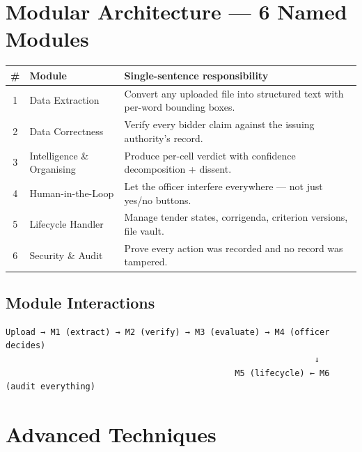 \documentclass[11pt,a4paper]{article}
\begin{document}
\section{Modular Architecture — 6 Named Modules}

\begin{center}
\begin{tabular}{clp{8cm}}
\toprule
\textbf{\#} & \textbf{Module} & \textbf{Single-sentence responsibility} \\
\midrule
1 & Data Extraction & Convert any uploaded file into structured text with per-word bounding boxes. \\
2 & Data Correctness & Verify every bidder claim against the issuing authority's record. \\
3 & Intelligence \& Organising & Produce per-cell verdict with confidence decomposition + dissent. \\
4 & Human-in-the-Loop & Let the officer interfere everywhere — not just yes/no buttons. \\
5 & Lifecycle Handler & Manage tender states, corrigenda, criterion versions, file vault. \\
6 & Security \& Audit & Prove every action was recorded and no record was tampered. \\
\bottomrule
\end{tabular}
\end{center}

\subsection{Module Interactions}

\begin{verbatim}
Upload → M1 (extract) → M2 (verify) → M3 (evaluate) → M4 (officer decides)
                                                              ↓
                                              M5 (lifecycle) ← M6 (audit everything)
\end{verbatim}

\section{Advanced Techniques}
\end{document}
